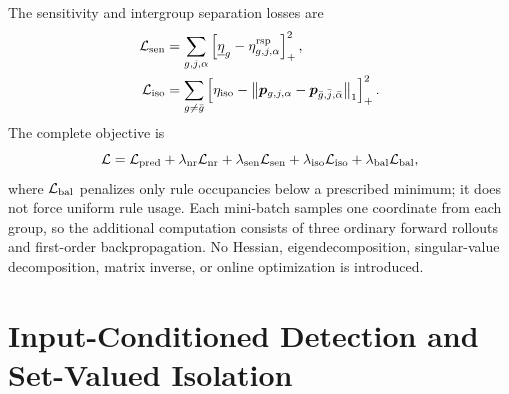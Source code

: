 \documentclass[journal]{IEEEtran}
\newcommand{\norm}[1]{\left\lVert #1\right\rVert}
\newcommand{\1}{\bm 1}
\begin{document}
The sensitivity and intergroup separation losses are
\begin{equation}
\begin{aligned}
\mathcal L_{\rm sen}
&=\sum_{g,j,\alpha}
\left[\underline{\eta}_g-\eta_{g,j,\alpha}^{\rm rsp}\right]_+^2,\\
\mathcal L_{\rm iso}
&=\sum_{g\ne\bar g}
\left[
\eta_{\rm iso}
-\norm{\bm p_{g,j,\alpha}
-\bm p_{\bar g,\bar j,\bar\alpha}}_1
\right]_+^2.
\end{aligned}
\label{eq:response_losses}
\end{equation}
The complete objective is
\begin{equation}
\mathcal L=
\mathcal L_{\rm pred}
+\lambda_{\rm nr}\mathcal L_{\rm nr}
+\lambda_{\rm sen}\mathcal L_{\rm sen}
+\lambda_{\rm iso}\mathcal L_{\rm iso}
+\lambda_{\rm bal}\mathcal L_{\rm bal},
\label{eq:complete_loss}
\end{equation}
where $\mathcal L_{\rm bal}$ penalizes only rule occupancies below a prescribed
minimum; it does not force uniform rule usage. Each mini-batch samples one
coordinate from each group, so the additional computation consists of three
ordinary forward rollouts and first-order backpropagation. No Hessian,
eigendecomposition, singular-value decomposition, matrix inverse, or online
optimization is introduced.

\section{Input-Conditioned Detection and Set-Valued Isolation}
\end{document}
